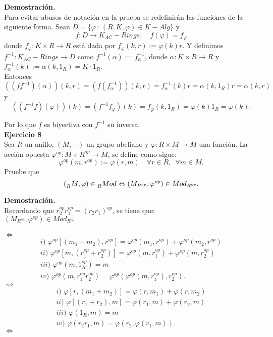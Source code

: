\documentclass{article}
\theoremstyle{definition}
\theoremstyle{plain}
\theoremstyle{plain}
\theoremstyle{definition}
\theoremstyle{definition}
\theoremstyle{definition}
\theoremstyle{definition}
\theoremstyle{definition}
\theoremstyle{definition}
\begin{document}
\textbf{Demostración.}\\
Para evitar abusos de notación en la prueba se redefinirán las funciones de la siguiente forma. Sean 
$D=\{\varphi \,:\, (R,K,\varphi)\in  K-Alg\}$ y 
\[f:D\longrightarrow K_{AC}-Rings, \quad f(\varphi)=f_\varphi\]
donde $f_\varphi:K\times R\to R$ está dada por $f_\varphi(k,r):=\varphi(k)r$. Y definimos \\
$f^{-1}:K_{AC}-Rings\longrightarrow D$ como $f^{-1}(\alpha):=f^{-1}_\alpha$, donde
 $\alpha:K\times R\to R$ y $f^{-1}_\alpha(k):=\alpha (k,1_R)=K\cdot 1_R$.\\
 
Entonces \[\left((ff^{-1})(\alpha)\right)(k,r)=\left(f(f^{-1}_\alpha)\right)(k,r)=f^{-1}_\alpha(k)r=\alpha(k,1_R)r=\alpha(k,r)\]
y
\[\left((f^{-1}f)(\varphi)\right)(k)=\left(f^{-1}f_\varphi\right)(k)=f_\varphi(k,1_R)=\varphi(k)1_R=\varphi(k).\]

Por lo que $f$ es biyectiva con $f^{-1}$ su inversa.\\

\textbf{Ejercicio 8} \\

Sea $R$ un anillo, $(M,+)$ un grupo abeliano y $\varphi:R\times M\to M$ una función. La acción opuesta 
$\varphi^{op}: M\times R^{op}\to M$, se define como sigue:
\[\varphi^{op}(m,r^{op}):= \varphi(r,m)\quad \forall r\in R, \,\,\, \forall m\in M.\]
Pruebe que
\[(\prescript{}{R}{M},\varphi)\in  \prescript{}{R}{Mod} \Leftrightarrow (M_{R^{op}},\varphi^{op})\in Mod_{R^{op}}.\]

\textbf{Demostración.}\\
Recordando que $r_2^{op}r_1^{op}=(r_2r_1)^{op}$, se tiene que:\\

$(M_{R^{op}},\varphi^{op})\in Mod_{R^{op}}$\\\\
$\Leftrightarrow$
\begin{gather*}
i)\,\,\varphi^{op}[(m_1+m_2),r^{op}]=\varphi^{op}(m_1,r^{op})+\varphi^{op}(m_2,r^{op})\\
ii)\,\,\varphi^{op}[m,(r_1^{op}+r_2^{op})]=\varphi^{op}(m,r_1^{op})+\varphi^{op}(m,r_2^{op})\\
iii)\,\, \varphi^{op}(m,1_R^{op})=m\\
iv)\,\, \varphi^{op}(m,r_1^{op}r_2^{op})=\varphi^{op}(\varphi^{op}(m,r_1^{op}),r_2^{op}).
\end{gather*}
 $\Leftrightarrow$
\begin{gather*}
i)\,\,\varphi[r,(m_1+m_2)]=\varphi(r,m_1)+\varphi(r,m_2)\\
ii)\,\,\varphi[(r_1+r_2),m]=\varphi(r_1,m)+\varphi(r_2,m)\\
iii)\,\, \varphi(1_R,m)=m\\
iv)\,\, \varphi(r_2r_1,m)=\varphi(r_2,\varphi(r_1,m)).
\end{gather*}
 $\Leftrightarrow$\\
 
\end{document}
